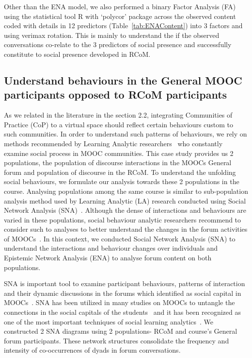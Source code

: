 \documentclass[format=acmsmall, review=false, screen=true]{acmart}
\begin{document}
Other than the ENA model, we also performed a binary Factor Analysis (FA)  using the statistical tool R with ‘polycor’ package across the observed content coded with details in 12 predictors (Table~\ref{tab:ENAContent}) into 3 factors and using verimax rotation. This is mainly to understand the if the observed conversations co-relate to the 3 predictors of social presence and successfully constitute to social presence developed in RCoM.


\subsection{Understand behaviours in the General MOOC participants opposed to RCoM participants}
As we related in the literature in the section 2.2, integrating Communities of Practice (CoP) to a virtual space should reflect certain behaviours custom to such communities. In order to understand such patterns of behaviours, we rely on methods recommended by Learning Analytic researchers~\cite{poquet2018mooc,joksimovic2015social} who constantly examine social process in MOOC communities. This case study provides us 2 populations, the population of discourse interactions in the MOOCs General forum and population of discourse in the RCoM. To understand the unfolding social behaviours, we formulate our analysis towards these 2 populations in the course. Analysing populations among the same course is similar to sub-population analysis method used by Learning Analytic (LA) research conducted using Social Network Analysis (SNA)~\cite{joksimovic2015social, poquet2018social}. Although the dense of interactions and behaviours are varied in these populations, social behaviour analytic researchers recommend to consider such to analyses to better understand the changes in the forum activities of MOOCs~\cite{dowell2015modeling, joksimovic2015social, poquet2018social, oleksandra2016untangling}. In this context, we conducted Social Network Analysis (SNA) to understand the interactions and behaviour changes over individuals and  Epistemic Network Analysis (ENA) to analyse forum content on both populations. 


SNA is important tool to examine participant behaviours, patterns of interaction and their dynamic discussions in the forums which identified as social capital in MOOCs~\cite{joksimovic2015you}. SNA has been utilized in many studies on MOOCs to untangle the connections in the social capitals of the students~\cite{oleksandra2016untangling,kovanovic2014source} and it has been recognized as one of the most important techniques of social learning analytics~\cite{shum2012social,ferguson2012social}. We constructed 2 SNA diagrams using 2 populations- RCoM and course's General forum participants. These network structures consolidate the frequency and intensity of co-occurrences of dyads in forum conversations. 
\end{document}
